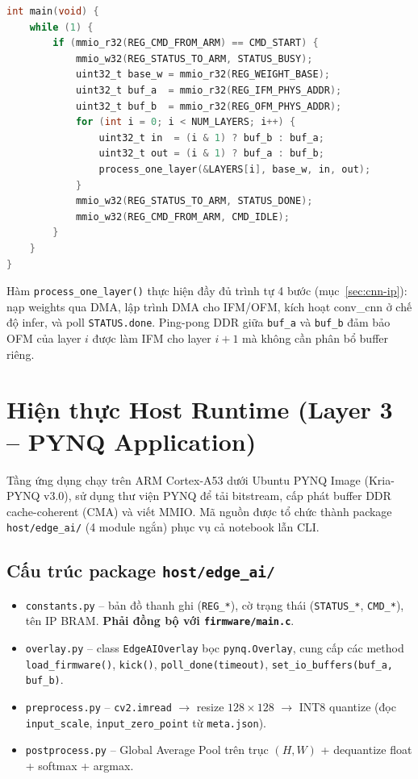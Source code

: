\begin{lstlisting}[language=C, caption={Polling loop chính của firmware.}]
int main(void) {
    while (1) {
        if (mmio_r32(REG_CMD_FROM_ARM) == CMD_START) {
            mmio_w32(REG_STATUS_TO_ARM, STATUS_BUSY);
            uint32_t base_w = mmio_r32(REG_WEIGHT_BASE);
            uint32_t buf_a  = mmio_r32(REG_IFM_PHYS_ADDR);
            uint32_t buf_b  = mmio_r32(REG_OFM_PHYS_ADDR);
            for (int i = 0; i < NUM_LAYERS; i++) {
                uint32_t in  = (i & 1) ? buf_b : buf_a;
                uint32_t out = (i & 1) ? buf_a : buf_b;
                process_one_layer(&LAYERS[i], base_w, in, out);
            }
            mmio_w32(REG_STATUS_TO_ARM, STATUS_DONE);
            mmio_w32(REG_CMD_FROM_ARM, CMD_IDLE);
        }
    }
}
\end{lstlisting}

Hàm \texttt{process\_one\_layer()} thực hiện đầy đủ trình tự 4 bước (mục~\ref{sec:cnn-ip}): nạp weights qua DMA, lập trình DMA cho IFM/OFM, kích hoạt conv\_cnn ở chế độ infer, và poll \texttt{STATUS.done}. Ping-pong DDR giữa \texttt{buf\_a} và \texttt{buf\_b} đảm bảo OFM của layer $i$ được làm IFM cho layer $i+1$ mà không cần phân bổ buffer riêng.

\newpage
\section{Hiện thực Host Runtime (Layer 3 -- PYNQ Application)}
\label{sec:host_runtime}

Tầng ứng dụng chạy trên ARM Cortex-A53 dưới Ubuntu PYNQ Image (Kria-PYNQ v3.0), sử dụng thư viện PYNQ để tải bitstream, cấp phát buffer DDR cache-coherent (CMA) và viết MMIO. Mã nguồn được tổ chức thành package \texttt{host/edge\_ai/} (4 module ngắn) phục vụ cả notebook lẫn CLI.

\subsection{Cấu trúc package \texttt{host/edge\_ai/}}
\begin{itemize}
    \item \texttt{constants.py} -- bản đồ thanh ghi (\texttt{REG\_*}), cờ trạng thái (\texttt{STATUS\_*}, \texttt{CMD\_*}), tên IP BRAM. \textbf{Phải đồng bộ với \texttt{firmware/main.c}}.
    \item \texttt{overlay.py} -- class \texttt{EdgeAIOverlay} bọc \texttt{pynq.Overlay}, cung cấp các method \texttt{load\_firmware()}, \texttt{kick()}, \texttt{poll\_done(timeout)}, \texttt{set\_io\_buffers(buf\_a, buf\_b)}.
    \item \texttt{preprocess.py} -- \texttt{cv2.imread} $\to$ resize $128 \times 128$ $\to$ INT8 quantize (đọc \texttt{input\_scale}, \texttt{input\_zero\_point} từ \texttt{meta.json}).
    \item \texttt{postprocess.py} -- Global Average Pool trên trục $(H, W)$ + dequantize float + softmax + argmax.
\end{itemize}


